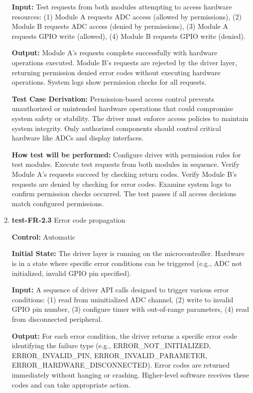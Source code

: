 \documentclass[12pt, titlepage]{article}
\begin{document}
\begin{enumerate}
\textbf{Input:}
Test requests from both modules attempting to access hardware resources:
(1) Module A requests ADC access (allowed by permissions),
(2) Module B requests ADC access (denied by permissions),
(3) Module A requests GPIO write (allowed),
(4) Module B requests GPIO write (denied).
					
\textbf{Output:}
Module A's requests complete successfully with hardware operations executed. 
Module B's requests are rejected by the driver layer, returning permission 
denied error codes without executing hardware operations. System logs show 
permission checks for all requests.

\textbf{Test Case Derivation:} 
Permission-based access control prevents unauthorized or unintended hardware 
operations that could compromise system safety or stability. The driver must 
enforce access policies to maintain system integrity. Only authorized components 
should control critical hardware like ADCs and display interfaces.
					
\textbf{How test will be performed:}
Configure driver with permission rules for test modules. Execute test requests 
from both modules in sequence. Verify Module A's requests succeed by checking 
return codes. Verify Module B's requests are denied by checking for error codes. 
Examine system logs to confirm permission checks occurred. The test passes if 
all access decisions match configured permissions.

\item{\textbf{test-FR-2.3} Error code propagation\\}

\textbf{Control:} Automatic
					
\textbf{Initial State:} 
The driver layer is running on the microcontroller. Hardware is in a state 
where specific error conditions can be triggered (e.g., ADC not initialized, 
invalid GPIO pin specified).
					
\textbf{Input:}
A sequence of driver API calls designed to trigger various error conditions:
(1) read from uninitialized ADC channel,
(2) write to invalid GPIO pin number,
(3) configure timer with out-of-range parameters,
(4) read from disconnected peripheral.
					
\textbf{Output:}
For each error condition, the driver returns a specific error code identifying 
the failure type (e.g., ERROR\_NOT\_INITIALIZED, ERROR\_INVALID\_PIN, 
ERROR\_INVALID\_PARAMETER, ERROR\_HARDWARE\_DISCONNECTED). Error codes are 
returned immediately without hanging or crashing. Higher-level software receives 
these codes and can take appropriate action.


\end{enumerate}
\end{document}
